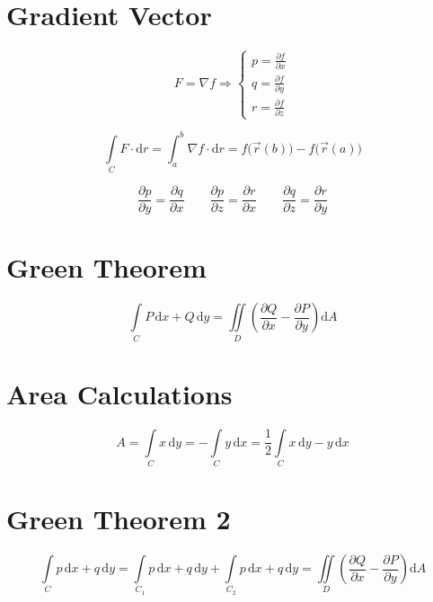 \documentclass[12pt, fleqn]{book}
\newcommand{\D}{\mathrm{d}}
\begin{document}
    \section{Gradient Vector}
		\begin{equation}
			F = \nabla f \Rightarrow
			\begin{cases}
				p = \frac{\partial f}{\partial x} \\
				q = \frac{\partial f}{\partial y} \\
				r = \frac{\partial f}{\partial z} 
			\end{cases}
		\end{equation} 
		
		\begin{equation}
			\int\limits_C F \cdot \D r = \int_{a}^{b} \nabla f \cdot \D r = f\big(\vec{r}(b)\big) - f\big(\vec{r}(a)\big)
		\end{equation}     
		
		\begin{equation}
			\frac{\partial p}{\partial y} = \frac{\partial q}{\partial x} \qquad
			\frac{\partial p}{\partial z} = \frac{\partial r}{\partial x} \qquad
			\frac{\partial q}{\partial z} = \frac{\partial r}{\partial y}
		\end{equation}
		
		\section{Green Theorem}
			\begin{equation}
				\int\limits_C P \, \D x + Q \, \D y = \iint\limits_D \left(\frac{\partial Q}{\partial x} - \frac{\partial P}{\partial y}\right) \D A
			\end{equation}
		
		\section{Area Calculations}
			\begin{equation}
				A = \int\limits_C x \, \D y = - \int\limits_C y \, \D x = \frac{1}{2} \int\limits_C x \, \D y - y \, \D x
			\end{equation}

		\section{Green Theorem 2}
			\begin{equation}
				\int\limits_C p \, \D x + q \, \D y = \int\limits_{C_{1}} p \, \D x + q \, \D y + \int\limits_{C_{2}} p \, \D x + q \, \D y = \iint\limits_D \left(\frac{\partial Q}{\partial x} - \frac{\partial P}{\partial y}\right) \D A
			\end{equation}
		
\end{document}
